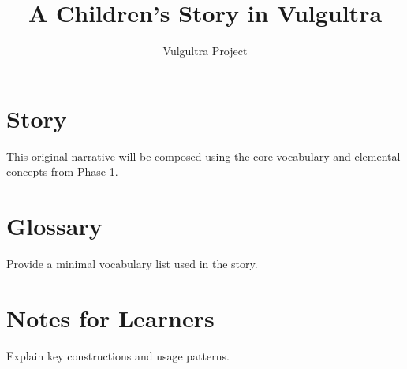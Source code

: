 \documentclass[12pt]{book}
\title{A Children's Story in Vulgultra}
\author{Vulgultra Project}
\date{}
\begin{document}
\maketitle
\tableofcontents

\chapter{Story}
This original narrative will be composed using the core vocabulary and
elemental concepts from Phase 1.

\chapter{Glossary}
Provide a minimal vocabulary list used in the story.

\chapter{Notes for Learners}
Explain key constructions and usage patterns.
\end{document}
